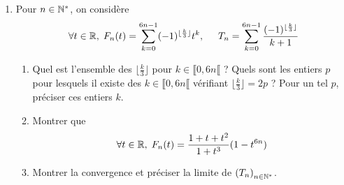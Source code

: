 \begin{enumerate}
  \item Pour $n\in \mathbb{N}^*$, on considère
\begin{displaymath}
\forall t\in \mathbb{R},\; 
F_n(t) = \sum_{k=0}^{6n-1}(-1)^{\lfloor \frac{k}{3}\rfloor}t^k,\hspace{0.5cm}
T_n = \sum_{k=0}^{6n-1} \frac{(-1)^{\lfloor \frac{k}{3}\rfloor}}{k+1}
\end{displaymath}
\begin{enumerate}
  \item Quel est l'ensemble des $\lfloor \frac{k}{3}\rfloor$ pour $k\in \llbracket 0, 6n \llbracket$ ? Quels sont les entiers $p$ pour lesquels il existe des $k\in \llbracket 0, 6n \llbracket$ vérifiant $\lfloor\frac{k}{3}\rfloor = 2p$ ? Pour un tel $p$, préciser ces entiers $k$.
  \item Montrer que 
\begin{displaymath}
\forall t\in \mathbb{R}, \; F_n(t) = \frac{1+t+t^2}{1+t^3}(1-t^{6n})  
\end{displaymath}
  \item Montrer la convergence et préciser la limite de $\left( T_n\right)_{n\in \mathbb{N}^*}$.
\end{enumerate}

\end{enumerate}
